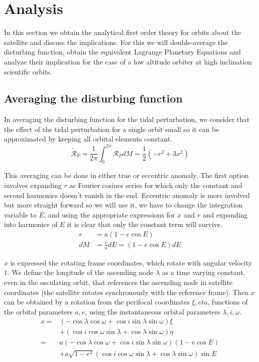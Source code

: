 \section{Analysis}
In this section we obtain the analytical first order theory for orbits about the satellite and discuss the implications. For this we will double-average the disturbing function, obtain the equivalent Lagrange Planetary Equations and analyze their implication for the case of a low altitude orbiter at high inclination scientific orbits.

\subsection{Averaging the disturbing function}
In averaging the disturbing function for the tidal perturbation, we consider that the effect of the tidal perturbation for a single orbit small so it can be approximated by keeping all orbital elements constant.
\begin{equation}
\tilde{\mathcal{R}}_P = \frac{1}{2\pi} \int_0^{2\pi} \mathcal{R}_P dM =\frac{1}{2}(-r^2 + 3 x^2)
\end{equation}

This averaging can be done in either true or eccentric anomaly. The first option involves expanding $r$ as Fourier cosines series for which only the constant and second harmonics doesn't vanish in the end. Eccentric anomaly is more involved but more straight forward so we will use it, we have to change the integration variable to $E$, and using the appropriate expressions for $x$ and $r$ and expanding into harmonics of $E$ it is clear that only the constant term will survive. 
\begin{align}
r &= a (1 - e \cos E) \\
dM &= \frac{r}{a} dE = (1 - e \cos E) dE
\end{align}

$x$ is expressed the rotating frame coordinates, which rotate with angular velocity $1$. We define the longitude of the ascending node $\lambda$ as a time varying constant, even in the osculating orbit, that references the ascending node in satellite coordinates (the satellite rotates synchronously with the reference frame). Then $x$ can be obtained by a rotation from the perifocal coordinates $\xi, eta$, functions of the orbital parameters $a,e$, using the instantaneous orbital parameters $\lambda, i, \omega$.
\begin{equation}
\begin{aligned}
x =& (-\cos\lambda \cos\omega + \cos i \sin\lambda \sin\omega) \xi \\
&+ (\cos i \cos\omega \sin\lambda + \cos\lambda \sin\omega) \eta \\
=& a (-\cos\lambda \cos\omega + \cos i \sin\lambda \sin\omega) (1 - e \cos E) \\
&+ a \sqrt{1-e^2} (\cos i \cos\omega \sin\lambda + \cos\lambda \sin\omega) \sin E
\end{aligned}
\end{equation}

